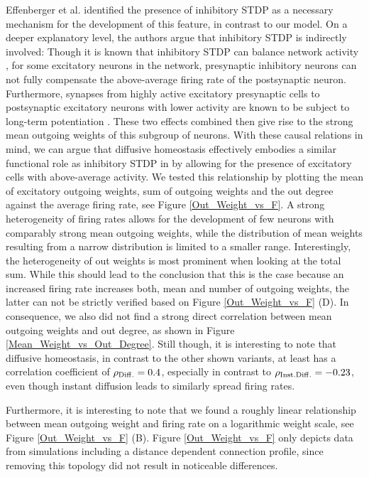 \documentclass[10pt,a4paper]{article}
\begin{document}
Effenberger et al. identified the presence of inhibitory STDP as a necessary mechanism for the development of this feature, in contrast to our model. On a deeper explanatory level, the authors argue that inhibitory STDP is indirectly involved: Though it is known that inhibitory STDP can balance network activity \cite{Vogels_2011}, for some excitatory neurons in the network, presynaptic inhibitory neurons can not fully compensate the above-average firing rate of the postsynaptic neuron. Furthermore, synapses from highly active excitatory presynaptic cells to postsynaptic excitatory neurons with lower activity are known to be subject to long-term potentiation \cite{Sjoestroem_Syn_Plasticity_2001,Feldman_STDP_2012}. These two effects combined then give rise to the strong mean outgoing weights of this subgroup of neurons. With these causal relations in mind, we can argue that diffusive homeostasis effectively embodies a similar functional role as inhibitory STDP in \cite{Effenberger_2015} by allowing for the presence of excitatory cells with above-average activity. We tested this relationship by plotting the mean of excitatory outgoing weights, sum of outgoing weights and the out degree against the average firing rate, see Figure \ref{Out_Weight_vs_F}. A strong heterogeneity of firing rates allows for the development of few neurons with comparably strong mean outgoing weights, while the distribution of mean weights resulting from a narrow distribution is limited to a smaller range. Interestingly, the heterogeneity of out weights is most prominent when looking at the total sum. While this should lead to the conclusion that this is the case because an increased firing rate increases both, mean and number of outgoing weights, the latter can not be strictly verified based on Figure \ref{Out_Weight_vs_F} (D). In consequence, we also did not find a strong direct correlation between mean outgoing weights and out degree, as shown in Figure \ref{Mean_Weight_vs_Out_Degree}. Still though, it is interesting to note that diffusive homeostasis, in contrast to the other shown variants, at least has a correlation coefficient of $\rho_{\rm Diff.} =  0.4$, especially in contrast to $\rho_{\rm Inst. Diff.} =  -0.23$, even though instant diffusion leads to similarly spread firing rates.

Furthermore, it is interesting to note that we found a roughly linear relationship between mean outgoing weight and firing rate on a logarithmic weight scale, see Figure \ref{Out_Weight_vs_F} (B). Figure \ref{Out_Weight_vs_F} only depicts data from simulations including a distance dependent connection profile, since removing this topology did not result in noticeable differences.
\end{document}

